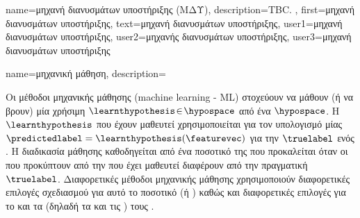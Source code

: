 {name={\foreignlanguage{greek}{μηχανή διανυσμάτων υποστήριξης (ΜΔΥ)}}, 
	description={TBC. },
	first={\foreignlanguage{greek}{μηχανή διανυσμάτων υποστήριξης}},
	text={\foreignlanguage{greek}{μηχανή διανυσμάτων υποστήριξης}},
	user1={\foreignlanguage{greek}{μηχανή διανυσμάτων υποστήριξης}}, %
	user2={\foreignlanguage{greek}{μηχανής διανυσμάτων υποστήριξης}}, %
	user3={\foreignlanguage{greek}{μηχανή διανυσμάτων υποστήριξης}} %
}

{name={\foreignlanguage{greek}{μηχανική μάθηση}},
	description={\foreignlanguage{greek}{Οι μέθοδοι μηχανικής μάθησης} 
		(machine learning - ML) \foreignlanguage{greek}{στοχεύουν να μάθουν (ή να βρουν) μία χρήσιμη}  
		 $\learnthypothesis\!\in\!\hypospace$ \foreignlanguage{greek}{από ένα}  $\hypospace$. 
		\foreignlanguage{greek}{Η $\learnthypothesis$ που έχουν μαθευτεί χρησιμοποιείται για τον υπολογισμό μίας}  
		$\predictedlabel=\learnthypothesis(\featurevec)$ \foreignlanguage{greek}{για την}  $\truelabel$ 
		\foreignlanguage{greek}{ενός} . \foreignlanguage{greek}{Η διαδικασία μάθησης καθοδηγείται από ένα 
		ποσοτικό}  \foreignlanguage{greek}{της}  \foreignlanguage{greek}{που προκαλείται όταν οι}  
		 \foreignlanguage{greek}{που προκύπτουν από την}  \foreignlanguage{greek}{που 
		έχει μαθευτεί διαφέρουν από την πραγματική}  $\truelabel$. \foreignlanguage{greek}{Διαφορετικές μέθοδοι 
		μηχανικής μάθησης χρησιμοποιούν διαφορετικές επιλογές σχεδιασμού για αυτό το ποσοτικό}  
		\foreignlanguage{greek}{(ή} ) \foreignlanguage{greek}{καθώς και διαφορετικές επιλογές για το} 
		 \foreignlanguage{greek}{και τα}  \foreignlanguage{greek}{(δηλαδή τα}
		 \foreignlanguage{greek}{και τις} ) \foreignlanguage{greek}{τους} 
		\cite[\foreignlanguage{greek}{Κεφ.} 3]{MLBasics}. 
		\begin{figure}[H]
			\centering
			\hspace*{5mm}
			\begin{tikzpicture}[
				node distance=1cm,
				auto,
				punkt/.style={
				rectangle,
				rounded corners,
				draw=black,
				very thick,
				text width=3cm,
				minimum height=1cm,
				align=center
				}
				]

\end{tikzpicture}
\end{figure}}}
